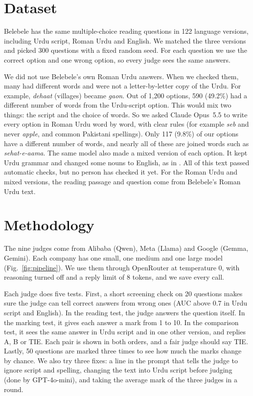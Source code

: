 \documentclass[conference]{IEEEtran}
\newcommand{\rom}[1]{\textit{#1}}  %
\begin{document}


\section{Dataset}
\label{sec:data}
Belebele \cite{bandarkar2024belebele} has the same multiple-choice reading questions in 122 language versions, including
Urdu script, Roman Urdu and English. We matched the three versions and picked 300 questions with a fixed random seed. For
each question we use the correct option and one wrong option, so every judge sees the same answers.

We did not use Belebele's own Roman Urdu answers. When we checked them, many had different words and were not a
letter-by-letter copy of the Urdu. For example, \rom{dehaat} (villages) became \rom{gaon}. Out of 1{,}200 options, 590
(49.2\%) had a different number of words from the Urdu-script option. This would mix two things: the script and the
choice of words. So we asked Claude Opus~5.5 to write every option in Roman Urdu word by word, with clear rules (for
example \rom{seb} and never \rom{apple}, and common Pakistani spellings). Only 117 (9.8\%) of our options have a different
number of words, and nearly all of these are joined words such as \rom{sehat-e-aama}. The same model also made a mixed
version of each option. It kept Urdu grammar and changed some nouns to English, as in \cite{mohamed2025lost}. All of this
text passed automatic checks, but no person has checked it yet. For the Roman Urdu and mixed versions, the reading passage
and question come from Belebele's Roman Urdu text.

\section{Methodology}
\label{sec:method}
The nine judges come from Alibaba (Qwen), Meta (Llama) and Google (Gemma, Gemini). Each company has one small, one
medium and one large model (Fig.~\ref{fig:pipeline}). We use them through OpenRouter at temperature 0, with reasoning
turned off and a reply limit of 8 tokens, and we save every call.

Each judge does five tests. First, a short screening check on 20 questions makes sure the judge can tell correct answers from wrong
ones (AUC above 0.7 in Urdu script and English). In the reading test, the judge answers the question itself. In the
marking test, it gives each answer a mark from 1 to 10. In the comparison test, it sees the same answer in Urdu script
and in one other version, and replies A, B or TIE. Each pair is shown in both orders, and a fair judge should say TIE.
Lastly, 50 questions are marked three times to see how much the marks change by chance. We also try three fixes: a line
in the prompt that tells the judge to ignore script and spelling, changing the text into Urdu script before judging
(done by GPT-4o-mini), and taking the average mark of the three judges in a round.
\end{document}
